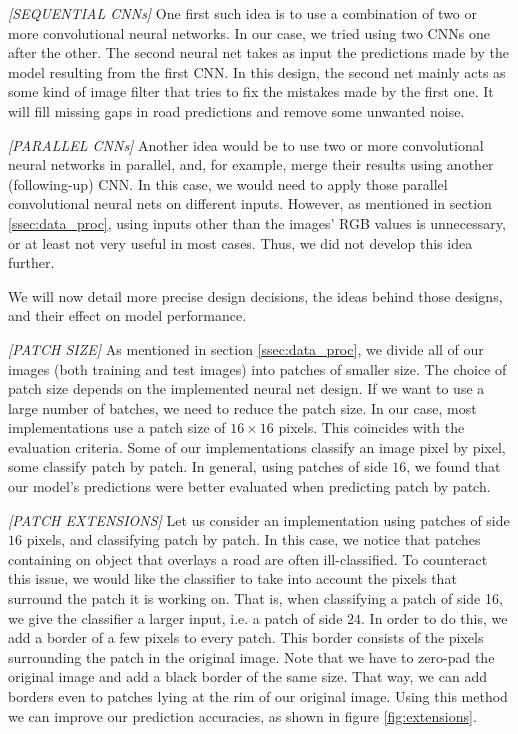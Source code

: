 \documentclass[10pt,conference,compsocconf]{IEEEtran}
\begin{document}
\textit{[SEQUENTIAL CNNs]}  
 One first such idea is to use a combination of two or more convolutional neural networks. In our case, we tried using two CNNs one after the other. The second neural net takes as input the predictions made by the model resulting from the first CNN. In this design, the second net mainly acts as some kind of image filter that tries to fix the mistakes made by the first one. It will fill missing gaps in road predictions and remove some unwanted noise.

\textit{[PARALLEL CNNs]}  
Another idea would be to use two or more convolutional neural networks in parallel, and, for example, merge their results using another (following-up) CNN. In this case, we would need to apply those parallel convolutional neural nets on different inputs. However, as mentioned in section \ref{ssec:data_proc}, using inputs other than the images' RGB values is unnecessary, or at least not very useful in most cases. Thus, we did not develop this idea further.

We will now detail more precise design decisions, the ideas behind those designs, and their effect on model performance.

\textit{[PATCH SIZE]} 
As mentioned in section \ref{ssec:data_proc}, we divide all of our images (both training and test images) into patches of smaller size. The choice of patch size depends on the implemented neural net design. If we want to use a large number of batches, we need to reduce the patch size. In our case, most implementations use a patch size of $16 \times 16$ pixels. This coincides with the evaluation criteria. Some of our implementations classify an image pixel by pixel, some classify patch by patch. In general, using patches of side $16$, we found that our model's predictions were better evaluated when predicting patch by patch.

\textit{[PATCH EXTENSIONS]} 
Let us consider an implementation using patches of side $16$ pixels, and classifying patch by patch. In this case, we notice that patches containing on object that overlays a road are often ill-classified. To counteract this issue, we would like the classifier to take into account the pixels that surround the patch it is working on. That is, when classifying a patch of side 16, we give the classifier a larger input, i.e. a patch of side $24$. In order to do this, we add a border of a few pixels to every patch. This border consists of the pixels surrounding the patch in the original image. Note that we have to zero-pad the original image and add a black border of the same size. That way, we can add borders even to patches lying at the rim of our original image. Using this method we can improve our prediction accuracies, as shown in figure \ref{fig:extensions}.
\end{document}
